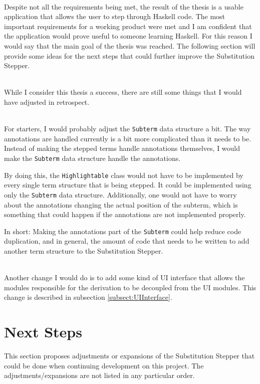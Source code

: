 \ \\
Despite not all the requirements being met,
the result of the thesis is a usable application that allows the user to step through Haskell code.
The most important requirements for a working product were met and I am confident that the application would prove useful to someone learning Haskell.
For this reason I would say that the main goal of the thesis was reached.
The following section will provide some ideas for the next steps that could further improve the Substitution Stepper.

\ \\
While I consider this thesis a success,
there are still some things that I would have adjusted in retrospect.

\ \\
For starters,
I would probably adjust the \texttt{Subterm} data structure a bit.
The way annotations are handled currently is a bit more complicated than it needs to be.
Instead of making the stepped terms handle annotations themselves,
I would make the \texttt{Subterm} data structure handle the annotations.

By doing this,
the \texttt{Highlightable} class would not have to be implemented by every single term structure that is being stepped.
It could be implemented using only the \texttt{Subterm} data structure.
Additionally,
one would not have to worry about the annotations changing the actual position of the subterm,
which is something that could happen if the annotations are not implemented properly.

In short: Making the annotations part of the \texttt{Subterm} could help reduce code duplication, and in general,
the amount of code that needs to be written to add another term structure to the Substitution Stepper.

\ \\
Another change I would do is to add some kind of UI interface that allows the modules responsible for the derivation to be decoupled from the UI modules.
This change is described in subsection \ref*{subsect:UIInterface}.


\section{Next Steps}

This section proposes adjustments or expansions of the Substitution Stepper that could be done when continuing development on this project.
The adjustments/expansions are not listed in any particular order.

